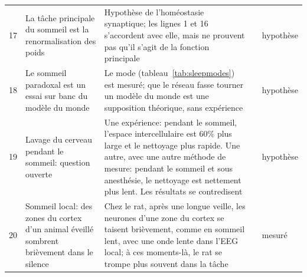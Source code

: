 {\begin{longtable}{>{\raggedright}p{0.5cm}>{\raggedright}p{4.0cm}>{\raggedright}p{5.6cm}>{\raggedright}p{2.3cm}>{\raggedright\arraybackslash}p{1.7cm}}
17 & La tâche principale du sommeil est la renormalisation des poids & Hypothèse de l'homéostasie synaptique; les lignes 1 et 16 s'accordent avec elle, mais ne prouvent pas qu'il s'agit de la fonction principale & \cite{TononiCirelli2014} & hypothèse \\
18 & Le sommeil paradoxal est un essai sur banc du modèle du monde & Le mode (tableau~\ref{tab:sleepmodes}) est mesuré; que le réseau fasse tourner un modèle du monde est une supposition théorique, sans expérience & \cite{Hobson2009} & hypothèse \\
19 & Lavage du cerveau pendant le sommeil: question ouverte & Une expérience: pendant le sommeil, l'espace intercellulaire est $60\%$ plus large et le nettoyage plus rapide. Une autre, avec une autre méthode de mesure: pendant le sommeil et sous anesthésie, le nettoyage est nettement plus lent. Les résultats se contredisent & \cite{Xie2013,Miao2024} & hypothèse \\
20 & Sommeil local: des zones du cortex d'un animal éveillé sombrent brièvement dans le silence & Chez le rat, après une longue veille, les neurones d'une zone du cortex se taisent brièvement, comme en sommeil lent, avec une onde lente dans l'EEG local; à ces moments-là, le rat se trompe plus souvent dans la tâche & \cite{Vyazovskiy2011} & mesuré \\
\bottomrule
\end{longtable}}

